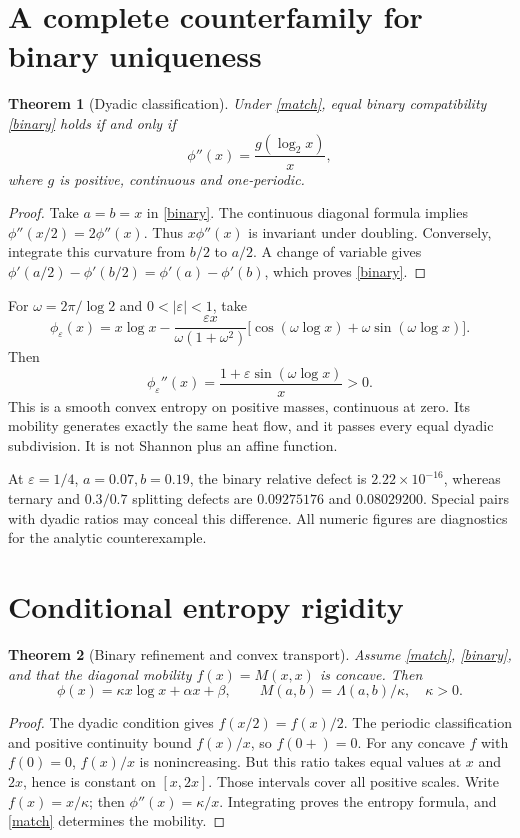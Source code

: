 \documentclass[11pt,a4paper]{article}
\newtheorem{theorem}{Theorem}
\begin{document}
\section{A complete counterfamily for binary uniqueness}

\begin{theorem}[Dyadic classification]
Under \eqref{match}, equal binary compatibility \eqref{binary} holds if and
only if
\[
\phi''(x)=\frac{g(\log_2x)}{x},
\]
where \(g\) is positive, continuous and one-periodic.
\end{theorem}
\begin{proof}
Take \(a=b=x\) in \eqref{binary}. The continuous diagonal formula implies
\(\phi''(x/2)=2\phi''(x)\). Thus \(x\phi''(x)\) is invariant under doubling.
Conversely, integrate this curvature from \(b/2\) to \(a/2\). A change of
variable gives
\(\phi'(a/2)-\phi'(b/2)=\phi'(a)-\phi'(b)\), which proves
\eqref{binary}.
\end{proof}

For \(\omega=2\pi/\log2\) and \(0<|\varepsilon|<1\), take
\[
\phi_\varepsilon(x)=x\log x-
\frac{\varepsilon x}{\omega(1+\omega^2)}
\big[\cos(\omega\log x)+\omega\sin(\omega\log x)\big].
\]
Then
\[
\phi_\varepsilon''(x)=
\frac{1+\varepsilon\sin(\omega\log x)}x>0.
\]
This is a smooth convex entropy on positive masses, continuous at zero.
Its mobility generates exactly the same heat flow, and it passes every
equal dyadic subdivision. It is not Shannon plus an affine function.

At \(\varepsilon=1/4\), \(a=0.07,b=0.19\), the binary relative defect is
\(2.22\times10^{-16}\), whereas ternary and \(0.3/0.7\) splitting defects are
\(0.09275176\) and \(0.08029200\).
Special pairs with dyadic ratios may conceal this difference. All numeric
figures are diagnostics for the analytic counterexample.

\section{Conditional entropy rigidity}

\begin{theorem}[Binary refinement and convex transport]
Assume \eqref{match}, \eqref{binary}, and that the diagonal mobility
\(f(x)=M(x,x)\) is concave. Then
\[
\boxed{
\phi(x)=\kappa x\log x+\alpha x+\beta,\qquad
M(a,b)=\Lambda(a,b)/\kappa,\quad\kappa>0.}
\]
\end{theorem}
\begin{proof}
The dyadic condition gives \(f(x/2)=f(x)/2\). The periodic classification and
positive continuity bound \(f(x)/x\), so \(f(0+)=0\).
For any concave \(f\) with \(f(0)=0\), \(f(x)/x\) is nonincreasing.
But this ratio takes equal values at \(x\) and \(2x\), hence is constant on
\([x,2x]\). Those intervals cover all positive scales. Write
\(f(x)=x/\kappa\); then \(\phi''(x)=\kappa/x\). Integrating proves the entropy
formula, and \eqref{match} determines the mobility.
\end{proof}
\end{document}
